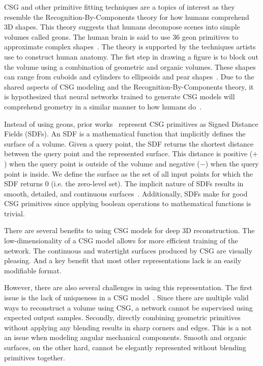 CSG and other primitive fitting techniques are a topics of interest as they resemble the Recognition-By-Components theory for how humans comprehend 3D shapes. This theory suggests that humans decompose scenes into simple volumes called geons. The human brain is said to use 36 geon primitives to approximate complex shapes~\cite{Biederman1987}. The theory is supported by the techniques artists use to construct human anatomy. The fist step in drawing a figure is to block out the volume using a combination of geometric and organic volumes. These shapes can range from cuboids and cylinders to ellipsoids and pear shapes~\cite{Winslow2015}. Due to the shared aspects of CSG modeling and the Recognition-By-Components theory, it is hypothesized that neural networks trained to generate CSG models will comprehend geometry in a similar manner to how humans do~\cite{Sharma2018}.

Instead of using geons, prior works~\cite{Sharma2018, Kania2020, Ren2021} represent CSG primitives as Signed Distance Fields (SDFs). An SDF is a mathematical function that implicitly defines the surface of a volume. Given a query point, the SDF returns the shortest distance between the query point and the represented surface. This distance is positive ($+$) when the query point is outside of the volume and negative ($-$) when the query point is inside. We define the surface as the set of all input points for which the SDF returns 0 (i.e. the zero-level set). The implicit nature of SDFs results in smooth, detailed, and continuous surfaces~\cite{Park2019}. Additionally, SDFs make for good CSG primitives since applying boolean operations to mathematical functions is trivial.

There are several benefits to using CSG models for deep 3D reconstruction. The low-dimensionality of a CSG model allows for more efficient training of the network. The continuous and watertight surfaces produced by CSG are visually pleasing. And a key benefit that most other representations lack is an easily modifiable format.

However, there are also several challenges in using this representation. The first issue is the lack of uniqueness in a CSG model~\cite{Hughes2013}. Since there are multiple valid ways to reconstruct a volume using CSG, a network cannot be supervised using expected output samples. Secondly, directly combining geometric primitives without applying any blending results in sharp corners and edges. This is a not an issue when modeling angular mechanical components. Smooth and organic surfaces, on the other hard, cannot be elegantly represented without blending primitives together.

